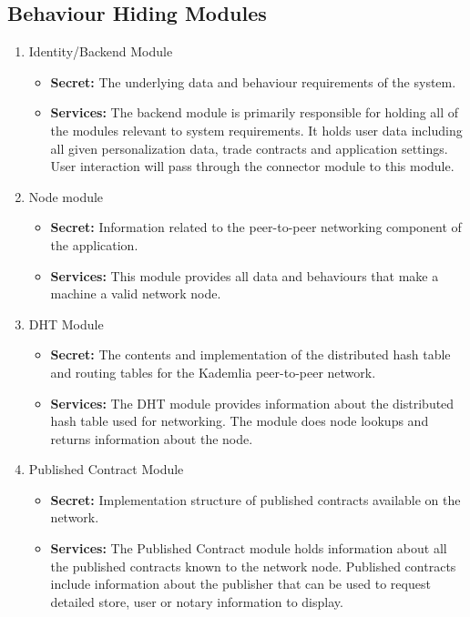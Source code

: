 \documentclass{article}
\begin{document}
\subsection{Behaviour Hiding Modules}
\begin{enumerate}
\item
Identity/Backend Module
\begin{itemize}
\item
\textbf{Secret:} The underlying data and behaviour requirements of the system.

\item
\textbf{Services:} The backend module is primarily responsible for holding all of the modules relevant to system requirements. It holds user data including all given personalization data, trade contracts and application settings. User interaction will pass through the connector module to this module.
\end{itemize}

\item
Node module
\begin{itemize}
\item
\textbf{Secret:} Information related to the peer-to-peer networking component of the application.

\item
\textbf{Services:} This module provides all data and behaviours that make a machine a valid network node.
\end{itemize}

\item
DHT Module
\begin{itemize}
\item
\textbf{Secret:} The contents and implementation of the distributed hash table and routing tables for the Kademlia peer-to-peer network.

\item
\textbf{Services:} The DHT module provides information about the distributed hash table used for networking. The module does node lookups and returns information about the node.
\end{itemize}

\item
Published Contract Module
\begin{itemize}
\item
\textbf{Secret:} Implementation structure of published contracts available on the network.

\item
\textbf{Services:} The Published Contract module holds information about all the published contracts known to the network node. Published contracts include information about the publisher that can be used to request detailed store, user or notary information to display.
\end{itemize}


\end{enumerate}
\end{document}
